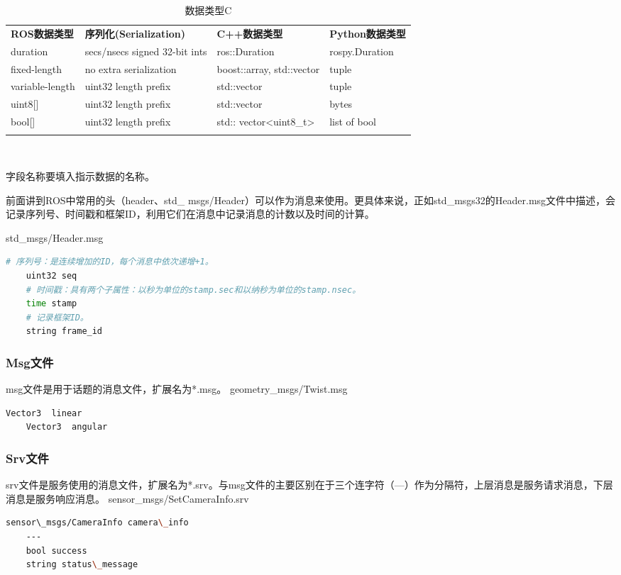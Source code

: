 \documentclass[geye,green,kindle,cn]{elegantnote}
\begin{document}
\begin{table}[htbp]
\centering
\begin{tabular}{p{35pt}<{\centering}|p{55pt}<{\centering}|p{40pt}<{\centering}|p{40pt}<{\centering}} 
\Xhline{1.0pt}
\textbf{\small{ROS数据类型}} &
\textbf{\small{序列化(Serialization)}} &
\textbf{\small{C++数据类型}} &
\textbf{\small{Python数据类型}} \\
\Xhline{1.0pt}
\scriptsize{duration} &
\scriptsize{secs/nsecs signed 32-bit ints} &
\scriptsize{ros::Duration} &
\scriptsize{rospy.Duration} \\
\hline
\scriptsize{fixed-length} &
\scriptsize{no extra serialization} &
\scriptsize{boost::array, std::vector} &
\scriptsize{tuple} \\
\hline
\scriptsize{variable-length} &
\scriptsize{uint32 length prefix} &
\scriptsize{std::vector} &
\scriptsize{tuple} \\
\hline
\scriptsize{uint8[]} &
\scriptsize{uint32 length prefix} &
\scriptsize{std::vector} &
\scriptsize{bytes} \\
\hline
\scriptsize{bool[]} &
\scriptsize{uint32 length prefix} &
\scriptsize{std:: vector<uint8\_t>} &
\scriptsize{list of bool} \\
\Xhline{1.0pt}
\end{tabular}
\centering
\caption{数据类型C} \label{table:DatatypeC}
\end{table}

字段名称要填入指示数据的名称。

前面讲到ROS中常用的头（header、std\_ msgs/Header）可以作为消息来使用。更具体来说，正如std\_msgs32的Header.msg文件中描述，会记录序列号、时间戳和框架ID，利用它们在消息中记录消息的计数以及时间的计算。

std\_msgs/Header.msg
\begin{lstlisting}[frame=single,language=bash]
    # 序列号：是连续增加的ID，每个消息中依次递增+1。 
    uint32 seq 
    # 时间戳：具有两个子属性：以秒为单位的stamp.sec和以纳秒为单位的stamp.nsec。 
    time stamp 
    # 记录框架ID。 
    string frame_id
\end{lstlisting}
\subsubsection{Msg文件}
msg文件是用于话题的消息文件，扩展名为*.msg。
geometry\_msgs/Twist.msg
\begin{lstlisting}[frame=single,language=bash]
    Vector3  linear
    Vector3  angular
\end{lstlisting}
\subsubsection{Srv文件}
srv文件是服务使用的消息文件，扩展名为*.srv。与msg文件的主要区别在于三个连字符（---）作为分隔符，上层消息是服务请求消息，下层消息是服务响应消息。
sensor\_msgs/SetCameraInfo.srv
\begin{lstlisting}[frame=single,language=bash]
    sensor\_msgs/CameraInfo camera\_info 
    ---
    bool success 
    string status\_message
\end{lstlisting}
\end{document}

